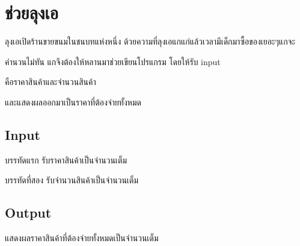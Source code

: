 \documentclass{article}
\begin{document}
\section*{ช่วยลุงเอ}

ลุงเอเปิดร้านขายขนมในชนบทแห่งหนึ่ง ด้วยความที่ลุงเอแกแก่แล้วเวลามีเด็กมาซื้อของเยอะๆแกจะ



คำนวนไม่ทัน แกจึงต้องให้หลานมาช่วยเขียนโปรแกรม โดยให้รับ input

คือราคาสินค้าและจำนวนสินค้า



และแสดงผลออกมาเป็นราคาที่ต้องจ่ายทั้งหมด



\subsection*{Input}
บรรทัดแรก รับราคาสินค้าเป็นจำนวนเต็ม



บรรทัดที่สอง รับจำนวนสินค้าเป็นจำนวนเต็ม



\subsection*{Output}
{แสดงผลราคาสินค้าที่ต้องจ่ายทั้งหมดเป็นจำนวนเต็ม}\\
\end{document}
